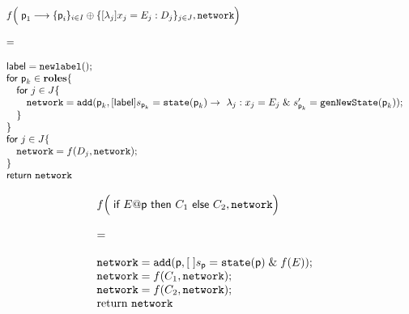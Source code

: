 \begin{displaymath}
  \begin{array}{ll}
    f\Big(\; \textsf{p}_1\longrightarrow\{\textsf{p}_i\}_{i\in I} \oplus \{[\lambda_j] x_j=E_j: D_j\}_{j\in J}, \texttt{network}
    \Big)
    \\\\
    =
    \\\\
    \textsf{label} = \texttt{newlabel}();\\
    \textsf{for } \textsf{p}_k \in \mathbf{roles} \{\\
    \quad\textsf{for } j \in J \{\\
    \quad\quad \texttt{network} = \texttt{add}(\textsf{p}_k,[\textsf{label}] {s_{\textsf{p}_k} = \texttt{state}(\textsf{p}_k)} \rightarrow\ \lambda_j : x_j=E_j\;\& \;s_{\textsf{p}_k}'=\texttt{genNewState}(\textsf{p}_k));\\
  	\quad\}\\
  	\}\\
	\textsf{for } j \in J \{\\
	\quad \texttt{network} = f(D_j, \texttt{network});  \\ 
	\}\\
  	\textsf{return } \texttt{network}
  \end{array}
\end{displaymath}

\begin{displaymath}
  \begin{array}{ll}
    f\Big(\; \textsf{if } E@\textsf{p} \textsf{ then } C_1 \textsf{ else } C_2, \texttt{network} 
    \Big)
    \\\\
    =
    \\\\
\texttt{network} = \texttt{add}(\textsf{p},[\;] {s_{\textsf{p}} = \texttt{state}(\textsf{p})} \;\& \;f(E));\\
	\texttt{network} = f(C_1, \texttt{network}); \\
	\texttt{network} = f(C_2, \texttt{network}); \\

 	\text{return } \texttt{network}
  \end{array}
\end{displaymath}


